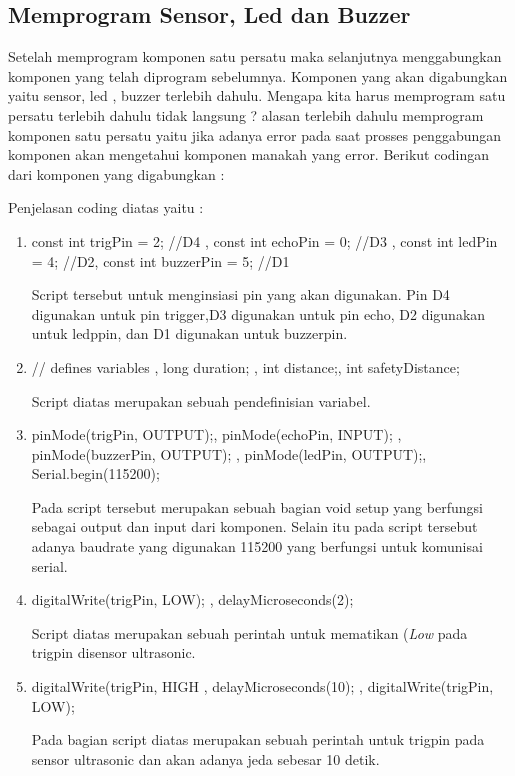 \subsection{Memprogram Sensor, Led dan Buzzer}
\par Setelah memprogram komponen satu persatu maka selanjutnya menggabungkan komponen yang telah diprogram sebelumnya. Komponen yang akan digabungkan yaitu sensor, led , buzzer terlebih dahulu. Mengapa kita harus memprogram satu persatu terlebih dahulu tidak langsung ? alasan terlebih dahulu memprogram komponen satu persatu yaitu jika adanya error pada saat prosses penggabungan komponen akan mengetahui komponen manakah yang error. Berikut codingan dari komponen yang digabungkan :

\par Penjelasan coding diatas yaitu :
\begin{enumerate}
\item const int trigPin = 2;  //D4 ,
const int echoPin = 0;  //D3 ,
const int ledPin = 4;  //D2, 
const int buzzerPin = 5;  //D1
\par Script tersebut untuk menginsiasi pin yang akan digunakan. Pin D4 digunakan untuk pin trigger,D3 digunakan untuk pin echo, D2 digunakan untuk ledppin, dan D1 digunakan untuk buzzerpin.

\item // defines variables ,
long duration; ,
int distance;, 
int safetyDistance;
\par Script diatas merupakan sebuah pendefinisian variabel.
\item pinMode(trigPin, OUTPUT);,
pinMode(echoPin, INPUT); ,
pinMode(buzzerPin, OUTPUT); ,
pinMode(ledPin, OUTPUT);,
Serial.begin(115200); 
\par Pada script tersebut merupakan sebuah bagian void setup yang berfungsi sebagai output dan input dari komponen. Selain itu pada script tersebut adanya baudrate yang digunakan 115200 yang berfungsi untuk komunisai serial.

\item digitalWrite(trigPin, LOW); ,
delayMicroseconds(2);

\par Script diatas merupakan sebuah perintah untuk mematikan (\textit{Low} pada trigpin disensor ultrasonic.

\item digitalWrite(trigPin, HIGH ,
delayMicroseconds(10); ,
digitalWrite(trigPin, LOW);
 
 \par Pada bagian script diatas merupakan sebuah perintah untuk trigpin pada sensor ultrasonic dan akan adanya jeda sebesar 10 detik.
 

\end{enumerate}
